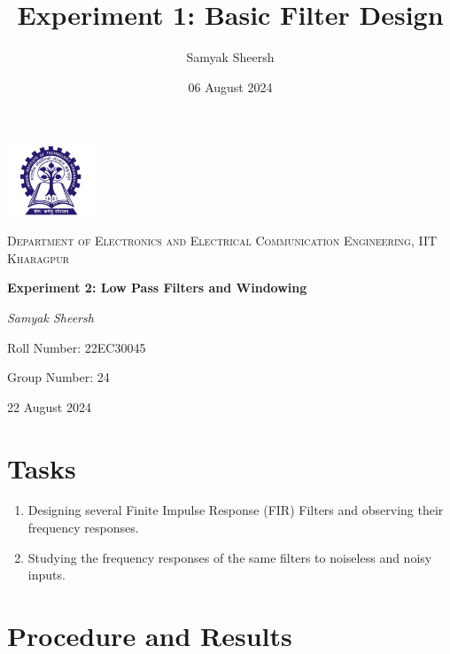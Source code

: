 \documentclass{article}
\title{Experiment 1: Basic Filter Design}
\author{Samyak Sheersh}
\date{06 August 2024}
\begin{document}
\begin{titlepage}
    \centering
    \includegraphics[width=0.2\textwidth]{KGP_logo.png}\par\vspace{1cm}
    {\scshape\LARGE Department of Electronics and Electrical Communication Engineering, IIT Kharagpur\par}
    \vspace{1cm}
    {\huge\bfseries Experiment 2:  Low Pass Filters and Windowing\par}
    \vspace{1.5cm}
    {\Large\itshape Samyak Sheersh\par}
    \vfill
    {\large Roll Number: 22EC30045\par}
    {\large Group Number: 24\par}
    \vfill
    {\large 22 August 2024\par}
\end{titlepage}

\section{Tasks}
\begin{enumerate}
\item Designing several Finite Impulse Response (FIR) Filters and observing their frequency responses.
\item Studying the frequency responses of the same filters to noiseless and noisy inputs.
\end{enumerate}

\section{Procedure and Results}
\end{document}
